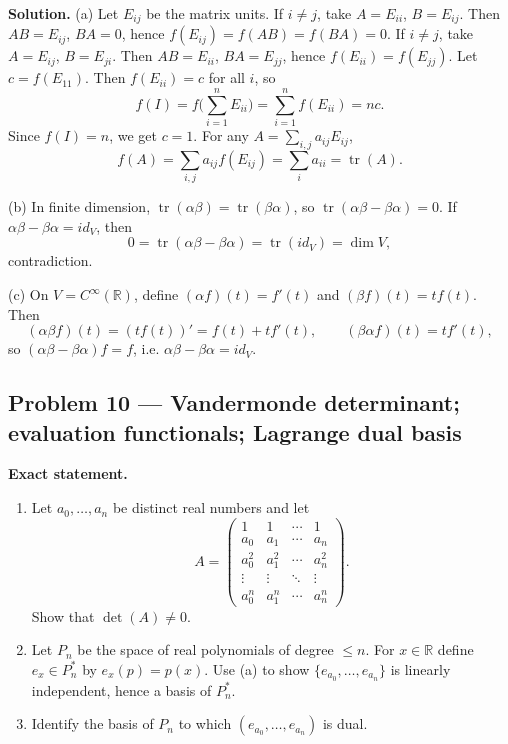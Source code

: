 \documentclass[12pt,a4paper]{article}
\theoremstyle{plain}
\theoremstyle{definition}      %
\begin{document}
\textbf{Solution.}
(a) Let \(E_{ij}\) be the matrix units. If \(i\neq j\), take \(A=E_{ii}\), \(B=E_{ij}\). Then \(AB=E_{ij}\), \(BA=0\), hence
\(f(E_{ij})=f(AB)=f(BA)=0\).
If \(i\neq j\), take \(A=E_{ij}\), \(B=E_{ji}\). Then \(AB=E_{ii}\), \(BA=E_{jj}\), hence \(f(E_{ii})=f(E_{jj})\).
Let \(c=f(E_{11})\). Then \(f(E_{ii})=c\) for all \(i\), so
\[
f(I)=f\Big(\sum_{i=1}^n E_{ii}\Big)=\sum_{i=1}^n f(E_{ii})=nc.
\]
Since \(f(I)=n\), we get \(c=1\).
For any \(A=\sum_{i,j} a_{ij}E_{ij}\),
\[
f(A)=\sum_{i,j} a_{ij}f(E_{ij})=\sum_i a_{ii}=\operatorname{tr}(A).
\]

(b) In finite dimension, \(\operatorname{tr}(\alpha\beta)=\operatorname{tr}(\beta\alpha)\), so
\(\operatorname{tr}(\alpha\beta-\beta\alpha)=0\).
If \(\alpha\beta-\beta\alpha=id_V\), then
\[
0=\operatorname{tr}(\alpha\beta-\beta\alpha)=\operatorname{tr}(id_V)=\dim V,
\]
contradiction.

(c) On \(V=C^\infty(\mathbb R)\), define \((\alpha f)(t)=f'(t)\) and \((\beta f)(t)=t f(t)\). Then
\[
(\alpha\beta f)(t)=(t f(t))'=f(t)+t f'(t),\qquad (\beta\alpha f)(t)=t f'(t),
\]
so \((\alpha\beta-\beta\alpha)f=f\), i.e. \(\alpha\beta-\beta\alpha=id_V\).

\subsection*{Problem 10 — Vandermonde determinant; evaluation functionals; Lagrange dual basis}

\textbf{Exact statement.}
\begin{enumerate}
	\item[(a)] Let \(a_0,\dots,a_n\) be distinct real numbers and let
	\[
	A=\begin{pmatrix}
		1&1&\cdots&1\\
		a_0&a_1&\cdots&a_n\\
		a_0^2&a_1^2&\cdots&a_n^2\\
		\vdots&\vdots&\ddots&\vdots\\
		a_0^n&a_1^n&\cdots&a_n^n
	\end{pmatrix}.
	\]
	Show that \(\det(A)\neq 0\).
	\item[(b)] Let \(P_n\) be the space of real polynomials of degree \(\le n\). For \(x\in\mathbb R\) define \(e_x\in P_n^*\) by
	\(e_x(p)=p(x)\). Use (a) to show \(\{e_{a_0},\dots,e_{a_n}\}\) is linearly independent, hence a basis of \(P_n^*\).
	\item[(c)] Identify the basis of \(P_n\) to which \((e_{a_0},\dots,e_{a_n})\) is dual.
\end{enumerate}
\end{document}
